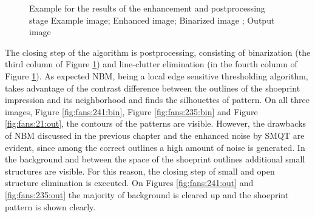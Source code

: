 \documentclass[draft,final]{vutinfth} %
\begin{document}
{\begin{figure}[H]

\caption{Example for the results of the enhancement and postprocessing stage
				 Example image;  Enhanced image;  Binarized image ;  Output image}
\label{fig:fans:enhance}

\end{figure}
}
\par
The closing step of the algorithm is postprocessing, consisting of binarization (the third column of Figure \ref{fig:fans:enhance}) and line-clutter elimination (in the fourth column of Figure \ref{fig:fans:enhance}).
As expected NBM, being a local edge sensitive thresholding algorithm, takes advantage of the contrast difference between the outlines of the shoeprint impression and its neighborhood and finds the silhouettes of pattern. 
On all three images, Figure \ref{fig:fans:241:bin}, Figure \ref{fig:fans:235:bin} and Figure \ref{fig:fans:21:out}, the contours of the patterns are visible.
However, the drawbacks of NBM discussed in the previous chapter and the enhanced noise by SMQT are evident, since among the correct outlines a high amount of noise is generated.
In the background and between the space of the shoeprint outlines additional small structures are visible.
For this reason, the closing step of small and open structure elimination is executed.
On Figures \ref{fig:fans:241:out} and \ref{fig:fans:235:out} the majority of background is cleared up and the shoeprint pattern is shown clearly.
\end{document}

